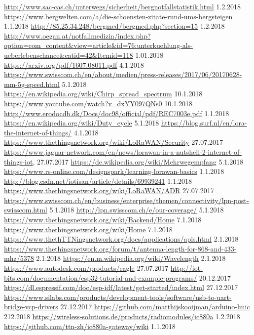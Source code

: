 \documentclass[11pt,english,german]{report}
\theoremstyle{definition}
\begin{document}
\begin{thebibliography}{1}
	 \url{http://www.sac-cas.ch/unterwegs/sicherheit/bergnotfallstatistik.html} 1.2.2018
	 \url{https://www.bergwelten.com/a/die-schoensten-zitate-rund-ums-bergsteigen} 1.1.2018
	 \url{http://85.25.34.248/bergmed/bergmed.php?section=15} 1.2.2018
	 \url{http://www.oegan.at/notfallmedizin/index.php?option=com_content&view=article&id=76:unterkuehlung-als-ueberlebenschance&catid=42&Itemid=118} 1.01.2018
	 \url{https://arxiv.org/pdf/1607.08011.pdf} 4.1.2018
	 \url{https://www.swisscom.ch/en/about/medien/press-releases/2017/06/20170628-mm-5g-speed.html} 5.1.2018
	\url{https://en.wikipedia.org/wiki/Chirp_spread_spectrum} 10.1.2018
	 \url{https://www.youtube.com/watch?v=dxYY097QNs0} 10.1.2018
	 \url{http://www.erodocdb.dk/Docs/doc98/official/pdf/REC7003e.pdf} 1.1.2018
	 \url{https://en.wikipedia.org/wiki/Duty_cycle} 5.1.2018
	 \url{https://blog.surf.nl/en/lora-the-internet-of-things/} 4.1.2018
	 \url{https://www.thethingsnetwork.org/wiki/LoRaWAN/Security} 27.07.2017
	 \url{https://www.jaguar-network.com/en/news/lorawan-in-a-nutshell-2-internet-of-things-iot}, 27.07.2017		
	 \url{https://de.wikipedia.org/wiki/Mehrwegempfang} 5.1.2018
	 \url{https://www.rs-online.com/designspark/learning-lorawan-basics} 1.1.2018
	 \url{http://blog.csdn.net/iotisan/article/details/69939241} 1.1.2018
	 \url{https://www.thethingsnetwork.org/wiki/LoRaWAN/ADR} 27.07.2017
	 \url{https://www.swisscom.ch/en/business/enterprise/themen/connectivity/lpn-post-swisscom.html} 5.1.2018
	 \url{http://lpn.swisscom.ch/e/our-coverage/} 5.1.2018
	 \url{https://www.thethingsnetwork.org/wiki/Backend/Home} 7.1.2018
	 \url{https://www.thethingsnetwork.org/wiki/Home} 7.1.2018
	 \url{https://www.thethTTNingsnetwork.org/docs/applications/apis.html} 2.1.2018
	 \url{https://www.thethingsnetwork.org/forum/t/antenna-length-for-868-and-433-mhz/5378} 2.1.2018
	 \url{https://en.m.wikipedia.org/wiki/Wavelength} 2.1.2018\\
	 \url{https://www.autodesk.com/products/eagle} 27.07.2017
	 \url{http://iot-bits.com/documentation/esp32-tutorial-and-example-programs/} 20.12.2017
	 \url{https://dl.espressif.com/doc/esp-idf/latest/get-started/index.html} 27.12.2017
	 \url{https://www.silabs.com/products/development-tools/software/usb-to-uart-bridge-vcp-drivers} 27.12.2017
	 \url{https://github.com/matthijskooijman/arduino-lmic} 212.2018
	 \url{https://wireless-solutions.de/products/radiomodules/ic880a} 1.2.2018
	 \url{https://github.com/ttn-zh/ic880a-gateway/wiki} 1.1.2018
	
\end{thebibliography}
\end{document}

